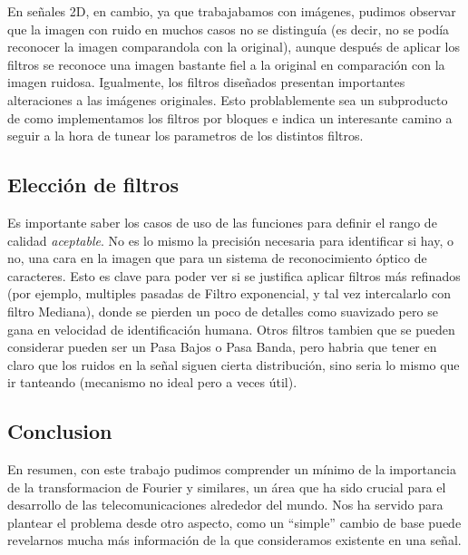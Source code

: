 En se\~nales 2D, en cambio, ya que trabajabamos con im\'agenes, pudimos observar que la imagen con ruido en muchos
casos no se distingu\'ia (es decir, no se pod\'ia reconocer la imagen comparandola con la original), aunque despu\'es
de aplicar los filtros se reconoce una imagen bastante fiel a la original en comparaci\'on con la imagen ruidosa. Igualmente,
los filtros dise\~nados presentan importantes alteraciones a las im\'agenes originales. Esto problablemente sea un subproducto de como
implementamos los filtros por bloques e indica un interesante camino a seguir a la hora de tunear los parametros de los distintos
filtros.

\subsection{Elecci\'on de filtros}

Es importante saber los casos de uso de las funciones para definir el rango de calidad \textit{aceptable}. No es lo mismo
la precisi\'on necesaria para identificar si hay, o no, una cara en la imagen que para un sistema de reconocimiento \'optico
de caracteres. Esto es clave para poder ver si se justifica aplicar filtros m\'as refinados (por ejemplo, multiples pasadas de 
Filtro exponencial, y tal vez intercalarlo con filtro Mediana), donde se pierden un poco de detalles como suavizado
pero se gana en velocidad de identificaci\'on humana. Otros filtros tambien que se pueden considerar pueden ser un Pasa Bajos o 
Pasa Banda, pero habria que tener en claro que los ruidos en la se\~nal siguen cierta distribuci\'on, sino seria lo mismo que ir
tanteando (mecanismo no ideal pero a veces \'util).

\subsection{Conclusion}
En resumen, con este trabajo pudimos comprender un m\'inimo de la importancia de la transformacion de Fourier y similares,
un \'area que ha sido crucial para el desarrollo de las telecomunicaciones alrededor del mundo. Nos ha servido para plantear
el problema desde otro aspecto, como un ``simple'' cambio de base puede revelarnos mucha m\'as informaci\'on de la que 
consideramos existente en una se\~nal. 
